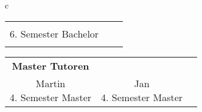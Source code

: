 \begin{tabular}{c}
\begin{tabular}{ccc}
%
&%
{\npicture[0.3\linewidth]%
{bilder/tutoren/joko}
{Jonathan\\ 6. Semester Bachelor \\
\randomize{j.koscielny@tu-bs.de}}
}\end{tabular}\tabularnewline
\begin{tabular}{ccc}
{ \textbf{Master Tutoren}}\\
\npicture[0.3\linewidth]
{bilder/tutoren/martinw.jpg}
{Martin\\ 4. Semester Master\\ \randomize{m.wegner@tu-bs.de}}
&
{ 
\npicture[0.3\linewidth]
{bilder/tutoren/jan.jpg}
{Jan\\ 4. Semester Master\\ \randomize{jhkluth@gmx.de}}
}&%


\end{tabular}
\end{tabular}
